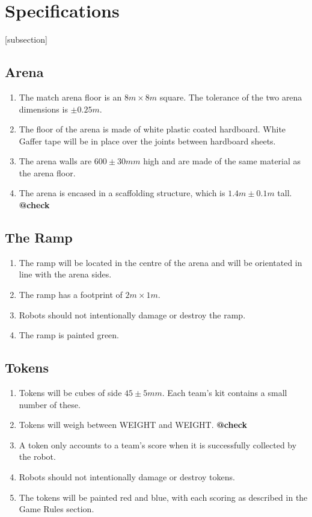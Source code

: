 \section{Specifications}
[subsection]
\newcommand{\rcnii}{\stepcounter{rulei}\arabic{section}.\arabic{subsection}.\arabic{rulei}}
\renewcommand{\labelenumi}{\rcnii}

\subsection{Arena}
\begin{enumerate}
\item The match arena floor is an $8m \times 8m$ square.
 The tolerance of the two arena dimensions is $\pm0.25m$.
\item The floor of the arena is made of white plastic coated hardboard.
 White Gaffer tape will be in place over the joints between hardboard sheets.
\item The arena walls are $600\pm30mm$ high and are made of the same material as the arena floor.
\item The arena is encased in a scaffolding structure, which is $1.4m \pm0.1m$ tall.	\textbf{@check}
\end{enumerate}

\subsection{The Ramp}
\label{ramp}
\begin {enumerate} 
\item The ramp will be located in the centre of the arena and will be orientated in line with the arena sides.
\item The ramp has a footprint of $2m \times 1m$.
\item Robots should not intentionally damage or destroy the ramp.
\item The ramp is painted green.
\end {enumerate}

\subsection{Tokens}
\label{tokens}
\begin {enumerate} 
\item Tokens will be cubes of side $45\pm5mm$.
 Each team's kit contains a small number of these.
\item Tokens will weigh between WEIGHT and WEIGHT.	\textbf{@check}
\item A token only accounts to a team's score when it is successfully collected by the robot.
\item Robots should not intentionally damage or destroy tokens.
\item The tokens will be painted red and blue, with each scoring as described in the Game Rules section.
\end {enumerate}

